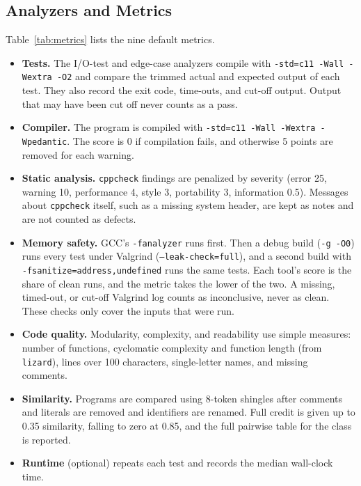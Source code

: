 \documentclass[conference]{IEEEtran}
\begin{document}
\subsection{Analyzers and Metrics}
Table~\ref{tab:metrics} lists the nine default metrics.
\begin{itemize}
  \item \textbf{Tests.} The I/O-test and edge-case analyzers compile with
        \texttt{-std=c11 -Wall -Wextra -O2} and compare the trimmed actual and
        expected output of each test. They also record the exit code, time-outs,
        and cut-off output. Output that may have been cut off never counts as a
        pass.
  \item \textbf{Compiler.} The program is compiled with \texttt{-std=c11 -Wall
        -Wextra -Wpedantic}. The score is 0 if compilation fails, and otherwise 5
        points are removed for each warning.
  \item \textbf{Static analysis.} \texttt{cppcheck} findings are penalized by
        severity (error 25, warning 10, performance 4, style 3, portability 3,
        information 0.5). Messages about \texttt{cppcheck} itself, such as a
        missing system header, are kept as notes and are not counted as defects.
  \item \textbf{Memory safety.} GCC's \texttt{-fanalyzer} runs first. Then a
        debug build (\texttt{-g -O0}) runs every test under Valgrind
        (\texttt{--leak-check=full}), and a second build with
        \texttt{-fsanitize=address,undefined} runs the same tests. Each tool's
        score is the share of clean runs, and the metric takes the lower of the
        two. A missing, timed-out, or cut-off Valgrind log counts as
        inconclusive, never as clean. These checks only cover the inputs that
        were run.
  \item \textbf{Code quality.} Modularity, complexity, and readability use
        simple measures: number of functions, cyclomatic complexity and function
        length (from \texttt{lizard}), lines over 100 characters,
        single-letter names, and missing comments.
  \item \textbf{Similarity.} Programs are compared using 8-token shingles after
        comments and literals are removed and identifiers are renamed. Full
        credit is given up to 0.35 similarity, falling to zero at 0.85, and the
        full pairwise table for the class is reported.
  \item \textbf{Runtime} (optional) repeats each test and records the median
        wall-clock time.
\end{itemize}
\end{document}
